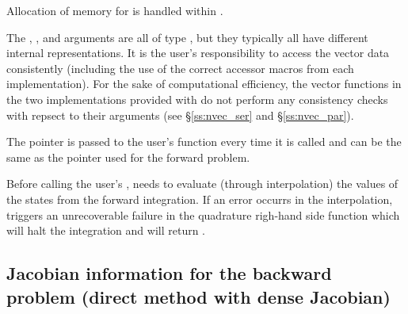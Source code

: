 {
  Allocation of memory for  is handled within {\cvodes}.

  The , , and  arguments are all 
  of type , but they typically all have 
  different internal representations. It is the user's 
  responsibility to access the vector data consistently (including the use of the 
  correct accessor macros from each {\nvector} implementation). For the sake of 
  computational efficiency, the vector functions in the two {\nvector} implementations 
  provided with {\cvodes} do not perform any consistency checks with repsect to their 
   arguments (see \S\ref{ss:nvec_ser} and \S\ref{ss:nvec_par}).

  The  pointer is passed to the user's  function every time 
  it is called and can be the same as the  pointer used for the forward problem.

  {\warn}Before calling the user's , {\cvodea} needs to evaluate
  (through interpolation) the values of the states from the forward integration. 
  If an error occurrs in the interpolation, {\cvodea} triggers an unrecoverable
  failure in the quadrature righ-hand side function which will halt the integration and
   will return .
}


\subsection{Jacobian information for the backward problem 
  (direct method with dense Jacobian)}
  
